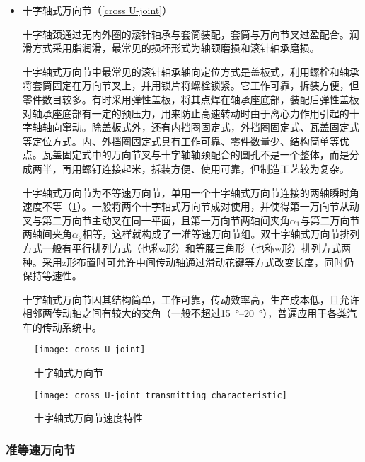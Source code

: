 \documentclass[UTF8]{ctexart}
\numberwithin{figure}{section}
\numberwithin{table}{section}
\begin{document}
\begin{itemize}
	\item 十字轴式万向节（\cref{cross U-joint}）

	      十字轴颈通过无内外圈的滚针轴承与套筒装配，套筒与万向节叉过盈配合。润滑方式采用脂润滑，最常见的损坏形式为轴颈磨损和滚针轴承磨损。

	      十字轴式万向节中最常见的滚针轴承轴向定位方式是盖板式，利用螺栓和轴承将套筒固定在万向节叉上，并用锁片将螺栓锁紧。它工作可靠，拆装方便，但零件数目较多。有时采用弹性盖板，将其点焊在轴承座底部，装配后弹性盖板对轴承座底部有一定的预压力，用来防止高速转动时由于离心力作用引起的十字轴轴向窜动。除盖板式外，还有内挡圈固定式，外挡圈固定式、瓦盖固定式等定位方式。内、外挡圈固定式具有工作可靠、零件数量少、结构简单等优点。瓦盖固定式中的万向节叉与十字轴轴颈配合的圆孔不是一个整体，而是分成两半，再用螺钉连接起米，拆装方便、使用可靠，但制造工艺较为复杂。

	      十字轴式万向节为不等速万向节，单用一个十字轴式万向节连接的两轴瞬时角速度不等（\cref{cross U-joint transmitting characteristic}）。一般将两个十字轴式万向节成对使用，并使得第一万向节从动叉与第二万向节主动叉在同一平面，且第一万向节两轴间夹角$\alpha_1$与第二万向节两轴间夹角$\alpha_2$相等，这样就构成了一准等速万向节组。双十字轴式万向节排列方式一般有平行排列方式（也称z形）和等腰三角形（也称w形）排列方式两种。采用z形布置时可允许中间传动轴通过滑动花键等方式改变长度，同时仍保持等速性。

	      十字轴式万向节因其结构简单，工作可靠，传动效率高，生产成本低，且允许相邻两传动轴之间有较大的交角（一般不超过\qtyrange[range-phrase = $\,\sim\,$, range-units = single]{15}{20}{\degree}），普遍应用于各类汽车的传动系统中。
\end{itemize}

\begin{figure}[htbp]
	\centering
	\begin{minipage}[b]{0.35\textwidth}
		\centering
		\texttt{[image: cross U-joint]}
		\caption{十字轴式万向节}
		\label{cross U-joint}
	\end{minipage}
	\begin{minipage}[b]{0.55\textwidth}
		\centering
		\texttt{[image: cross U-joint transmitting characteristic]}
		\caption{十字轴式万向节速度特性}
		\label{cross U-joint transmitting characteristic}
	\end{minipage}
\end{figure}

\subsubsection{准等速万向节}
\end{document}
